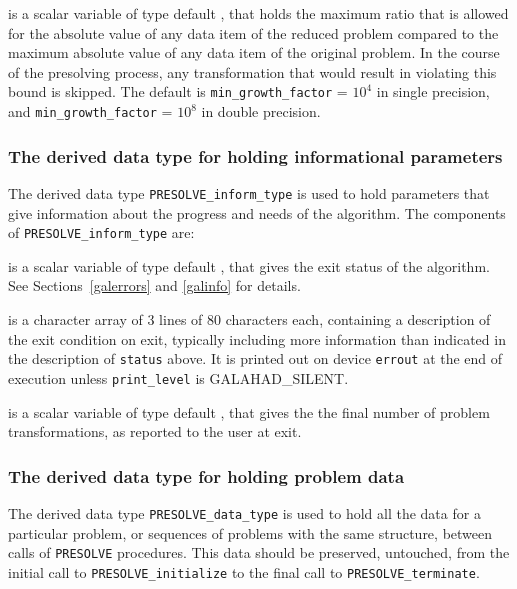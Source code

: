 \documentclass{galahad}
\newcommand{\packagename}{PRESOLVE}
\newcommand{\sym}{\sf\small}
\begin{document}
\begin{description}
 is a scalar variable of type default
\realdp, that holds the maximum ratio that is allowed for the absolute
value of any data item of the reduced problem compared to the maximum
absolute value of any data item of the original problem.  In the
course of the presolving process, any transformation that would result in
violating this bound is skipped.
The default is {\tt min\_growth\_factor} = $10^{4}$ in single
precision, and {\tt min\_growth\_factor} = $10^{8}$ in double
precision. 

\end{description}


\subsubsection{The derived data type for holding informational
 parameters}\label{typeinform}
The derived data type 
{\tt \packagename\_inform\_type} 
is used to hold parameters that give information about the progress and needs 
of the algorithm. The components of 
{\tt \packagename\_inform\_type} 
are:

\begin{description}

 is a scalar variable of type default \integer, that gives the
exit status of the algorithm. See Sections~\ref{galerrors} and \ref{galinfo}
for details.

 is a character array of 3 lines of 80 characters each, 
containing a description of the exit condition
on exit, typically including more information
than indicated in the description of {\tt status} above.
It is printed out on device {\tt errout} at the end of execution
unless {\tt print\_level} is {\sym GALAHAD\_SILENT}.

 is a scalar variable of type default \integer, that
gives the the final number of problem transformations, as reported
to the user at exit.
\end{description}


\subsubsection{The derived data type for holding problem data}\label{typedata}
The derived data type 
{\tt \packagename\_data\_type} 
is used to hold all the data for a particular problem,
or sequences of problems with the same structure, between calls of 
{\tt \packagename} procedures. 
This data should be preserved, untouched, from the initial call to 
{\tt \packagename\_initialize}
to the final call to
{\tt \packagename\_terminate}.
\end{document}

